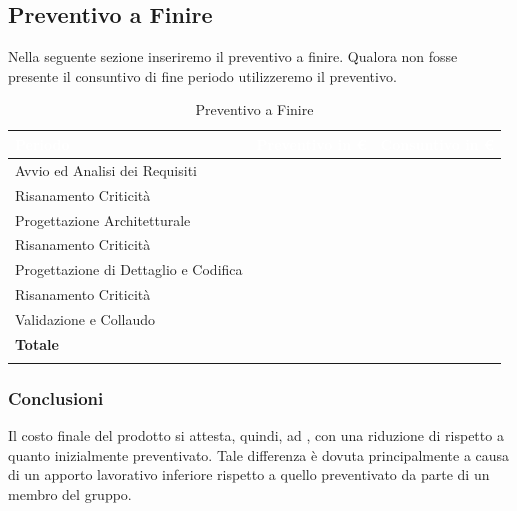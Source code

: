 \subsection{Preventivo a Finire}\label{caption_paf}

Nella seguente sezione inseriremo il preventivo a finire. Qualora non fosse presente il consuntivo di fine periodo utilizzeremo il preventivo. \\

\begin{longtable}{| C{.30\textwidth}| C{.15\textwidth}| C{.20\textwidth}|}
\hline
{}\textbf{\textcolor{white}{Periodo}} & \textbf{\textcolor{white}{Preventivo in \euro}} & \textbf{\textcolor{white}{Consuntivo in \euro}} \\
\hline
Avvio ed Analisi dei Requisiti &  &  \\
\hline
{}Risanamento Criticità &   &  \\
\hline
Progettazione Architetturale &  &  \\
\hline
{} Risanamento Criticità &  &  \\
\hline
Progettazione di Dettaglio e Codifica &  &  \\
\hline
{} Risanamento Criticità &   &  \\
\hline
Validazione e Collaudo &   &  \\
\hline
{}\textbf{Totale} &   & \textbf{}  \\
\hline
\caption{Preventivo a Finire}
\label{paf}
\end{longtable}

\subsubsection{Conclusioni}\label{PAF_RA}
Il costo finale del prodotto si attesta, quindi, ad , con una riduzione di  rispetto a quanto inizialmente preventivato. Tale differenza è dovuta principalmente a causa di un apporto lavorativo inferiore rispetto a quello preventivato da parte di un membro del gruppo. 

